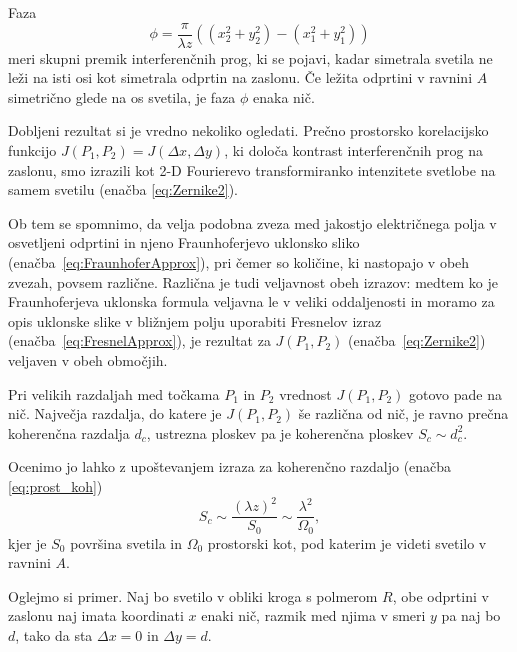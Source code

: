 Faza 
\begin{equation}
\phi=\frac{\pi}{\lambda z}\left((x_{2}^{2}+y_{2}^{2})-(x_{1}^{2}+y_{1}^{2})\right)
\end{equation}
meri skupni premik interferenčnih prog, ki se pojavi, kadar simetrala svetila
ne leži na isti osi kot simetrala odprtin na zaslonu. Če ležita odprtini v ravnini $A$ 
simetrično glede na os svetila, je faza $\phi$ enaka nič.

Dobljeni rezultat si je vredno nekoliko ogledati. Prečno prostorsko
korelacijsko funkcijo $J(P_{1},P_{2}) = J(\Delta x,\Delta y)$, ki določa kontrast interferenčnih
prog na zaslonu, smo izrazili kot 2-D  Fourierevo transformiranko intenzitete svetlobe
na samem svetilu (enačba \ref{eq:Zernike2}). 

\begin{remark}
Ob tem se spomnimo,
da velja podobna zveza med jakostjo električnega polja v osvetljeni odprtini 
in njeno Fraunhoferjevo uklonsko sliko (enačba~\ref{eq:FraunhoferApprox}), 
pri čemer so količine, ki nastopajo v obeh zvezah,
povsem različne. Različna je tudi veljavnost obeh izrazov: medtem ko je Fraunhoferjeva
uklonska formula veljavna le v veliki oddaljenosti in moramo za opis uklonske slike v bližnjem polju
uporabiti Fresnelov izraz (enačba~\ref{eq:FresnelApprox}), 
je rezultat za $J(P_{1},P_{2})$ (enačba~\ref{eq:Zernike2}) veljaven v obeh območjih.
\end{remark}

Pri velikih razdaljah med točkama $P_{1}$ in $P_{2}$ vrednost $J(P_{1},P_{2})$ 
gotovo pade na nič. Največja razdalja, do katere je $J(P_{1},P_{2})$ še različna od nič, je ravno
prečna koherenčna razdalja $d_{c}$, ustrezna ploskev pa je koherenčna
ploskev $S_{c} \sim d_c^2$. 

Ocenimo jo lahko z upoštevanjem izraza 
za koherenčno razdaljo (enačba \ref{eq:prost_koh}) 
\begin{equation}
S_{c}\sim\frac{(\lambda z)^{2}}{S_{0}}\sim\frac{\lambda^{2}}{\Omega_{0}},
\label{eq:koherencna-ploskev}
\end{equation}
kjer je $S_{0}$ površina svetila in $\Omega_{0}$ prostorski kot,
pod katerim je videti svetilo v ravnini $A$. 

Oglejmo si primer. Naj bo svetilo v obliki kroga 
s polmerom $R$, obe odprtini v zaslonu naj imata koordinati $x$ enaki nič, razmik
med njima v smeri $y$ pa naj bo $d$, tako da sta $\Delta x = 0$ in $\Delta y = d$. 

